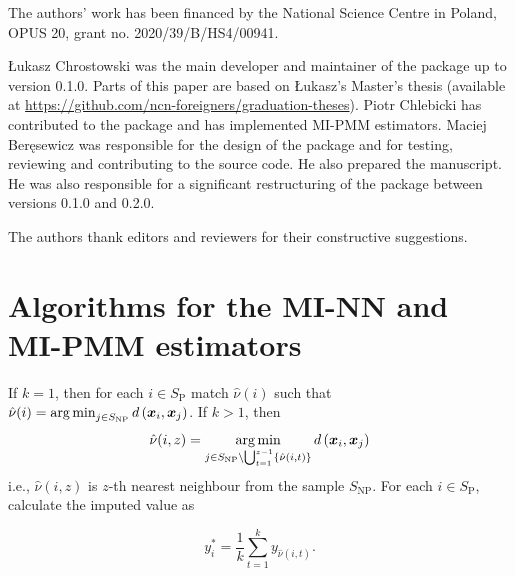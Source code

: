 \documentclass[nojss]{jss}
\begin{document}
The authors' work has been financed by the National Science Centre in
Poland, OPUS 20, grant no. 2020/39/B/HS4/00941.

Łukasz Chrostowski was the main developer and maintainer of the package
up to version 0.1.0. Parts of this paper are based on Łukasz's Master's
thesis (available at
\url{https://github.com/ncn-foreigners/graduation-theses}). Piotr
Chlebicki has contributed to the package and has implemented MI-PMM
estimators. Maciej Beręsewicz was responsible for the design of the
package and for testing, reviewing and contributing to the source code.
He also prepared the manuscript. He was also responsible for a
significant restructuring of the package between versions 0.1.0 and
0.2.0.

The authors thank editors and reviewers for their constructive
suggestions.




\clearpage

\appendix

\section{Algorithms for the MI-NN and MI-PMM
estimators}\label{sec-details}

\begin{algorithm}[ht!]
\caption{Mass imputation using the $k$ nearest neighbour algorithm}
\label{algo-2}
\begin{algorithmic}[1]
\State If $k=1$, then for each $i \in S_{\text{P}}$ match $\hat{\nu}(i)$ such that
$\hat{\nu}(i)=
\operatornamewithlimits{arg\,min}_{j\in S_{\text{NP}}}d\left(\boldsymbol{x}_i,\boldsymbol{x}_j\right)$.
\State If $k>1$, then
$$\hat{\nu}(i, z) = \operatornamewithlimits{arg\,min}_{j\in S_{\text{NP}}\setminus\bigcup_{t=1}^{z-1}
\{\hat{\nu}(i, t)\}} d\left(\boldsymbol{x}_i, \boldsymbol{x}_j\right)$$
i.e., $\hat{\nu}(i, z)$ is $z$-th nearest neighbour from the sample $S_{\text{NP}}$.\;
\State For each $i \in S_{\text{P}}$, calculate the imputed value as

$$
y_i^* = \frac{1}{k}\sum_{t=1}^{k}y_{\hat{\nu}(i, t)}.
$$
\end{algorithmic}
\end{algorithm}
\end{document}
